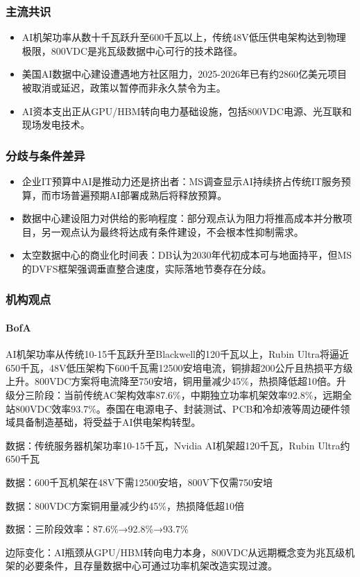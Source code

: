 \documentclass[11pt]{ctexart}
\begin{document}
\subsubsection*{主流共识}
\begin{itemize}
  \item AI机架功率从数十千瓦跃升至600千瓦以上，传统48V低压供电架构达到物理极限，800VDC是兆瓦级数据中心可行的技术路径。
  \item 美国AI数据中心建设遭遇地方社区阻力，2025-2026年已有约2860亿美元项目被取消或延迟，政策以暂停而非永久禁令为主。
  \item AI资本支出正从GPU/HBM转向电力基础设施，包括800VDC电源、光互联和现场发电技术。
\end{itemize}
\subsubsection*{分歧与条件差异}
\begin{itemize}
  \item 企业IT预算中AI是推动力还是挤出者：MS调查显示AI持续挤占传统IT服务预算，而市场普遍预期AI部署成熟后将释放预算。
  \item 数据中心建设阻力对供给的影响程度：部分观点认为阻力将推高成本并分散项目，另一观点认为最终将达成有条件建设，不会根本性抑制需求。
  \item 太空数据中心的商业化时间表：DB认为2030年代初成本可与地面持平，但MS的DVFS框架强调垂直整合速度，实际落地节奏存在分歧。
\end{itemize}
\subsubsection*{机构观点}
\paragraph{BofA} AI机架功率从传统10-15千瓦跃升至Blackwell的120千瓦以上，Rubin Ultra将逼近650千瓦，48V低压架构下600千瓦需12500安培电流，铜排超200公斤且热损平方级上升。800VDC方案将电流降至750安培，铜用量减少45\%，热损降低超10倍。升级分三阶段：当前传统AC架构效率87.6\%，中期独立功率机架效率92.8\%，远期全站800VDC效率93.7\%。泰国在电源电子、封装测试、PCB和冷却液等周边硬件领域具备制造基础，将受益于AI供电架构转型。
{\small\color{refgray}数据：传统服务器机架功率10-15千瓦，Nvidia AI机架超120千瓦，Rubin Ultra约650千瓦\par}
{\small\color{refgray}数据：600千瓦机架在48V下需12500安培，800V下仅需750安培\par}
{\small\color{refgray}数据：800VDC方案铜用量减少约45\%，热损降低超10倍\par}
{\small\color{refgray}数据：三阶段效率：87.6\%→92.8\%→93.7\%\par}
{\small\color{refgray}边际变化：AI瓶颈从GPU/HBM转向电力本身，800VDC从远期概念变为兆瓦级机架的必要条件，且存量数据中心可通过功率机架改造实现过渡。\par}
\end{document}
